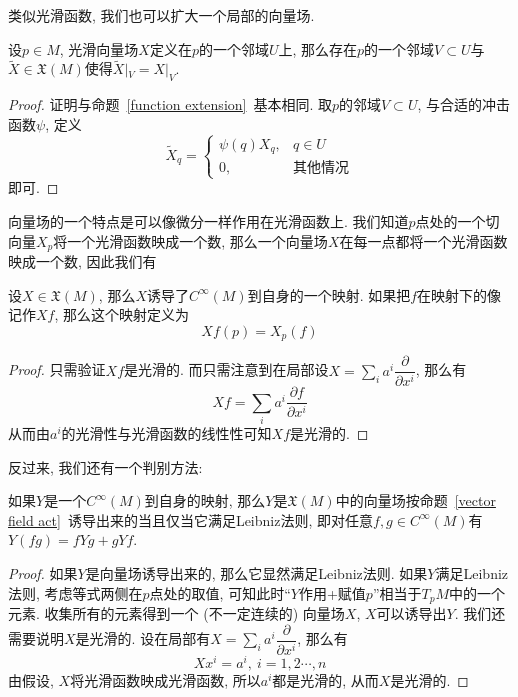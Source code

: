 类似光滑函数, 我们也可以扩大一个局部的向量场.
\begin{prop}[向量场扩充引理]\label{vector field extension}
    设$p\in M$, 光滑向量场$X$定义在$p$的一个邻域$U$上, 那么存在$p$的一个邻域$V\subset U$与$\widetilde{X}\in \mathfrak{X}(M)$使得$\widetilde{X}|_V=X|_V$.
\end{prop}
\begin{proof}
    证明与命题~\ref{function extension}~基本相同.
    取$p$的邻域$V\subset U$, 与合适的冲击函数$\psi$, 定义
    \[\widetilde{X}_q=\begin{cases}
        \psi(q)X_q, & q\in U\\
        0, & \text{其他情况}
    \end{cases}\]
    即可.
\end{proof}

向量场的一个特点是可以像微分一样作用在光滑函数上.
我们知道$p$点处的一个切向量$X_p$将一个光滑函数映成一个数, 那么一个向量场$X$在每一点都将一个光滑函数映成一个数,
因此我们有
\begin{prop}\label{vector field act}
    设$X\in\mathfrak{X}(M)$, 那么$X$诱导了$C^\infty(M)$到自身的一个映射.
    如果把$f$在映射下的像记作$Xf$, 那么这个映射定义为
    \[Xf(p)=X_p(f)\]
\end{prop}
\begin{proof}
    只需验证$Xf$是光滑的.
    而只需注意到在局部设$\displaystyle X=\sum_{i}a^i\dfrac{\partial}{\partial x^i}$, 那么有
    \[Xf=\sum_{i}a^i\frac{\partial f}{\partial x^i}\]
    从而由$a^i$的光滑性与光滑函数的线性性可知$Xf$是光滑的.
\end{proof}
反过来, 我们还有一个判别方法:
\begin{prop}
    如果$Y$是一个$C^\infty(M)$到自身的映射, 那么$Y$是$\mathfrak{X}(M)$中的向量场按命题~\ref{vector field act}~诱导出来的当且仅当它满足Leibniz法则, 即对任意$f,g\in C^\infty(M)$有$Y(fg)=fYg+gYf$.
\end{prop}
\begin{proof}
    如果$Y$是向量场诱导出来的, 那么它显然满足Leibniz法则.
    如果$Y$满足Leibniz法则, 考虑等式两侧在$p$点处的取值, 可知此时``$Y$作用+赋值$p$''相当于$T_pM$中的一个元素.
    收集所有的元素得到一个 (不一定连续的) 向量场$X$, $X$可以诱导出$Y$.
    我们还需要说明$X$是光滑的.
    设在局部有$\displaystyle X=\sum_{i}a^i\dfrac{\partial}{\partial x^i}$, 那么有
    \[Xx^i=a^i,\ i=1,2\cdots,n\]
    由假设, $X$将光滑函数映成光滑函数, 所以$a^i$都是光滑的, 从而$X$是光滑的.
\end{proof}

